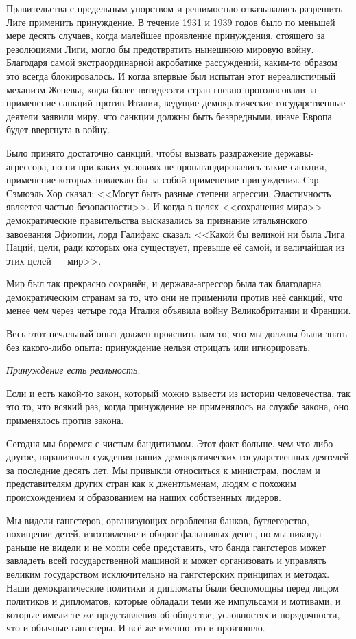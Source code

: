 Правительства с предельным упорством и решимостью отказывались разрешить Лиге применить принуждение. В течение 1931 и 1939 годов было по меньшей мере десять случаев, когда малейшее проявление принуждения, стоящего за резолюциями Лиги, могло бы предотвратить нынешнюю мировую войну. Благодаря самой экстраординарной акробатике рассуждений, каким-то образом это всегда блокировалось. И когда впервые был испытан этот нереалистичный механизм Женевы, когда более пятидесяти стран гневно проголосовали за применение санкций против Италии, ведущие демократические государственные деятели заявили миру, что санкции должны быть безвредными, иначе Европа будет ввергнута в войну.

Было принято достаточно санкций, чтобы вызвать раздражение державы-агрессора, но ни при каких условиях не пропагандировались такие санкции, применение которых повлекло бы за собой применение принуждения. Сэр Сэмюэль Хор сказал: <<Могут быть разные степени агрессии. Эластичность является частью безопасности>>. И когда в целях <<сохранения мира>> демократические правительства высказались за признание итальянского завоевания Эфиопии, лорд Галифакс сказал: <<Какой бы великой ни была Лига Наций, цели, ради которых она существует, превыше её самой, и величайшая из этих целей — мир>>.

Мир был так прекрасно сохранён, и держава-агрессор была так благодарна демократическим странам за то, что они не применили против неё санкций, что менее чем через четыре года Италия объявила войну Великобритании и Франции.

Весь этот печальный опыт должен прояснить нам то, что мы должны были знать без какого-либо опыта: принуждение нельзя отрицать или игнорировать.

\textit{Принуждение есть реальность}.

Если и есть какой-то закон, который можно вывести из истории человечества, так это то, что всякий раз, когда принуждение не применялось на службе закона, оно применялось против закона.

Сегодня мы боремся с чистым бандитизмом. Этот факт больше, чем что-либо другое, парализовал суждения наших демократических государственных деятелей за последние десять лет. Мы привыкли относиться к министрам, послам и представителям других стран как к джентльменам, людям с похожим происхождением и образованием на наших собственных лидеров.

Мы видели гангстеров, организующих ограбления банков, бутлегерство, похищение детей, изготовление и оборот фальшивых денег, но мы никогда раньше не видели и не могли себе представить, что банда гангстеров может завладеть всей государственной машиной и может организовать и управлять великим государством исключительно на гангстерских принципах и методах. Наши демократические политики и дипломаты были беспомощны перед лицом политиков и дипломатов, которые обладали теми же импульсами и мотивами, и которые имели те же представления об обществе, условностях и порядочности, что и обычные гангстеры. И всё же именно это и произошло.

